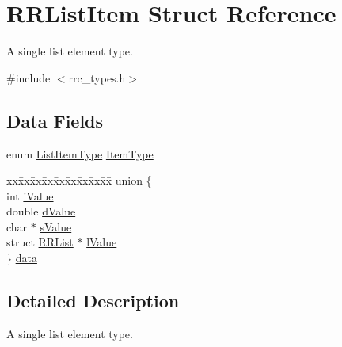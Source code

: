 \hypertarget{struct_r_r_list_item}{\section{R\-R\-List\-Item Struct Reference}
\label{struct_r_r_list_item}
}


A single list element type.  




{\ttfamily \#include $<$rrc\-\_\-types.\-h$>$}

\subsection*{Data Fields}
\begin{DoxyCompactItemize}
\item 
enum \hyperlink{rrc__types_8h_ab99437ab2e88aa90b7ebb8add042b25e}{List\-Item\-Type} \hyperlink{struct_r_r_list_item_a25c3073c0827a19b3ec0a0ea6d2ad5df}{Item\-Type}
\item 
\begin{tabbing}
xx\=xx\=xx\=xx\=xx\=xx\=xx\=xx\=xx\=\kill
union \{\\
\>int \hyperlink{struct_r_r_list_item_ac5de02e20d85842177a764866cef4ad2}{iValue}\\
\>double \hyperlink{struct_r_r_list_item_ada9c8889b93084880c4bed9c9feeaa42}{dValue}\\
\>char $\ast$ \hyperlink{struct_r_r_list_item_a80e5abe988376805a91503e24e8d1efd}{sValue}\\
\>struct \hyperlink{struct_r_r_list}{RRList} $\ast$ \hyperlink{struct_r_r_list_item_afa0e0bc7c68d478c6819e82bedb5525f}{lValue}\\
\} \hyperlink{struct_r_r_list_item_ac5bcd1de26b6efabd485bce48ecf8a8a}{data}\\

\end{tabbing}\end{DoxyCompactItemize}


\subsection{Detailed Description}
A single list element type. 

